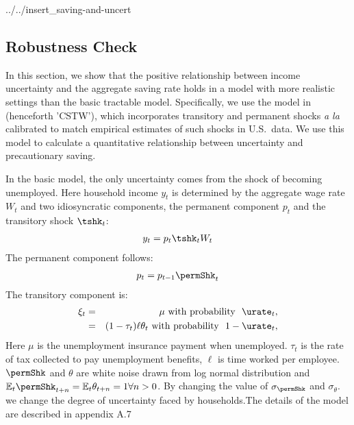 \documentclass[../../cjSOE.tex]{subfiles}
\begin{document}
\begin{verbatimwrite}{../../insert_saving-and-uncert}
\subsection{Robustness Check}

In this section, we show that the positive relationship between income uncertainty and the aggregate saving rate holds in a model with more realistic settings than the basic tractable model. Specifically, we use the model in \cite{cstwMPC} (henceforth 'CSTW'), which incorporates transitory and permanent shocks {\it a la} \cite{friedmanATheory} calibrated to match empirical estimates of such shocks in U.S.\ data.  We use this model to calculate a quantitative relationship between uncertainty and precautionary saving.  

In the basic model, the only uncertainty comes from the shock of becoming unemployed. Here household income $y_{t}$ is determined by the aggregate wage rate $W_{t}$ and two idiosyncratic components, the permanent component $p_{t}$ and the transitory shock $\tshk_{t}$:
\begin{align}
y_{t}=p_{t}\tshk_{t}{W}_{t}
\end{align}
The permanent component follows:
\begin{align}
p_{t}=p_{t-1}\permShk_{t}
\end{align}
The transitory component is:
\begin{eqnarray}
  \xi_{t} & = & \mu \textrm{ with probability }\ \urate_{t}, \label{eq:tran}
\\ & = & (1-\tau_{t})\ell\theta_{t} \textrm{ with probability }\ 1-\urate_{t}, \nonumber
\end{eqnarray}
Here $\mu$ is the unemployment insurance payment when unemployed. $\tau_{t}$ is the rate of tax collected to pay unemployment benefits, $\ell$ is time worked per employee. $\permShk$ and $\theta$ are white noise drawn from log normal distribution and $\mathbb{E}_{t}\permShk_{t+n}=\mathbb{E}_{t}\theta_{t+n}=1\forall n>0$. By changing the value of $\sigma_{\permShk}$ and $\sigma_{\theta}$. we change the degree of uncertainty faced by households.The details of the model are described in appendix A.7


\end{verbatimwrite}
\end{document}
